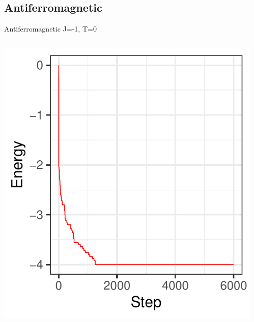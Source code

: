 \documentclass{beamer}
\begin{document}
\subsection{Antiferromagnetic}


\begin{frame}{Antiferromagnetic J=-1, T=0}
\begin{columns}
\begin{column}{0.5\textwidth}
    \begin{center}
     \includegraphics[width=\textwidth]{Pic/J-1_10_6000_T=0_ENERGY.pdf}
     \end{center}
\end{column}
\begin{column}{0.5\textwidth}
    \begin{center}

\end{center}
\end{column}
\end{columns}
\end{frame}
\end{document}
